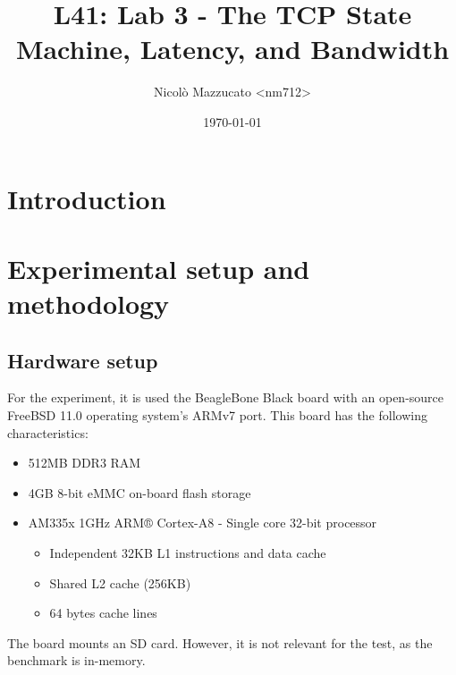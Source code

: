 \documentclass[a4paper,10pt]{article}
\begin{document}
\title{L41: Lab 3 - The TCP State Machine, Latency, and Bandwidth}
\author{Nicolò Mazzucato \textless{}nm712\textgreater{}}
\date{\today}

\maketitle

\thispagestyle{empty}

\begin{abstract}



\end{abstract}

\clearpage

\setcounter{page}{1}

\section{Introduction}

\section{Experimental setup and methodology}

\subsection{Hardware setup}

For the experiment, it is used the BeagleBone Black board with an open-source FreeBSD\cite{mckusick_design_2014} 11.0 operating system’s ARMv7 port. This board has the following characteristics:
\begin{itemize}
    \item 512MB DDR3 RAM
    \item 4GB 8-bit eMMC on-board flash storage
    \item AM335x 1GHz ARM® Cortex-A8 - Single core 32-bit processor\cite{noauthor_am3358_nodate}
    \begin{itemize}
        \item Independent 32KB L1 instructions and data cache
        \item Shared L2 cache (256KB)
        \item 64 bytes cache lines
    \end{itemize}
\end{itemize}

The board mounts an SD card. However, it is not relevant for the test, as the benchmark is in-memory.
\end{document}
